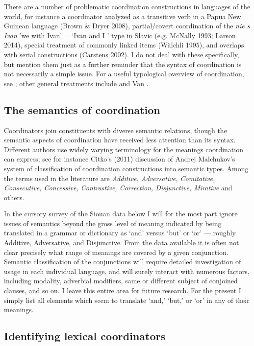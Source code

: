 \documentclass[output=paper]{LSP/langsci}
\begin{document}
There are a number of problematic coordination constructions in languages of the world, for instance a coordinator analyzed as a transitive verb in a Papua New Guinean language (Brown \& Dryer 2008),  partial/covert coordination of the \textit{nie s Ivan} 'we with Ivan' = `Ivan and I ' type in Slavic (e.g. McNally 1993; Larson 2014), special treatment of commonly linked items (W\"alchli 1995), and overlaps with serial constructions (Carstens 2002). I do not deal with these specifically, but mention them just as a further reminder that the syntax of coordination is not necessarily a simple issue. For a useful typological overview of coordination, see \citet{Haspelmath2007}; other general treatments include \citet{Johannessen1998} and Van \citet{Oirsouw1987}. 

\subsection{The semantics of coordination}

Coordinators join constituents with diverse semantic relations, though the semantic aspects of coordination have received less attention than its syntax. Different authors use widely varying terminology for the meanings coordination can express; see for instance Citko's (2011) discussion of Andrej Malchukov's system of classification of coordination constructions into semantic types. Among the terms used in the literature are \textit{Additive, Adversative, Comitative, Consecutive, Concessive, Contrastive, Correction, Disjunctive, Mirative} and others.

In the cursory survey of the Siouan data below I will for the most part ignore issues of semantics beyond the gross level of meaning indicated by being translated in a grammar or dictionary as `and' versus `but' or `or' --- roughly Additive, Adversative, and Disjunctive. From the data available it is often not clear precisely what range of meanings are covered by a given conjunction. Semantic classification of the conjunctions will require detailed investigation of usage in each individual language, and will surely interact with numerous factors, including modality, adverbial modifiers, same or different subject of conjoined clauses, and so on. I leave this entire area for future research. For the present I simply list all elements which seem to translate `and,' `but,' or `or' in any of their meanings.

\subsection{Identifying lexical coordinators}
\end{document}
